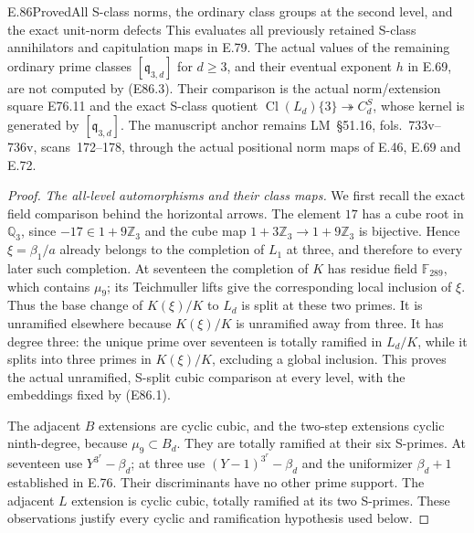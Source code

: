 \begin{statement}{E.86}{Proved}{All S-class norms, the ordinary class groups at the second level, and the exact unit-norm defects}
This evaluates all previously retained S-class
annihilators and capitulation maps in E.79. The actual
values of the remaining ordinary prime classes
$[\mathfrak q_{3,d}]$ for $d\ge3$, and their eventual
exponent $h$ in E.69, are not computed by (E86.3).
Their comparison is the actual norm/extension square
E76.11 and the exact S-class quotient
$\operatorname{Cl}(L_d)\{3\}\twoheadrightarrow C_d^S$,
whose kernel is generated by $[\mathfrak q_{3,d}]$.
The manuscript anchor remains LM~\S51.16,
fols.~733v--736v, scans~172--178, through the actual
positional norm maps of E.46, E.69 and E.72.
\end{statement}

\begin{proof}
\emph{The all-level automorphisms and their class maps.}
We first recall the exact field comparison behind the
horizontal arrows. The element $17$ has a cube root
in $\mathbb Q_3$, since $-17\in1+9\mathbb Z_3$ and
the cube map $1+3\mathbb Z_3\to1+9\mathbb Z_3$ is
bijective. Hence $\xi=\beta_1/a$ already belongs to
the completion of $L_1$ at three, and therefore to
every later such completion. At seventeen the
completion of $K$ has residue field $\mathbb F_{289}$,
which contains $\mu_9$; its Teichmuller lifts give
the corresponding local inclusion of $\xi$. Thus
the base change of $K(\xi)/K$ to $L_d$ is split
at these two primes. It is unramified elsewhere
because $K(\xi)/K$ is unramified away from three.
It has degree three: the unique prime over seventeen
is totally ramified in $L_d/K$, while it splits
into three primes in $K(\xi)/K$, excluding a global
inclusion. This proves the actual unramified,
S-split cubic comparison at every level, with
the embeddings fixed by (E86.1).

The adjacent $B$ extensions are cyclic cubic,
and the two-step extensions cyclic ninth-degree,
because $\mu_9\subset B_d$. They are totally
ramified at their six S-primes. At seventeen use
$Y^{3^r}-\beta_d$; at three use
$(Y-1)^{3^r}-\beta_d$ and the uniformizer
$\beta_d+1$ established in E.76. Their discriminants
have no other prime support. The adjacent $L$
extension is cyclic cubic, totally ramified at
its two S-primes. These observations justify every
cyclic and ramification hypothesis used below.


\end{proof}
